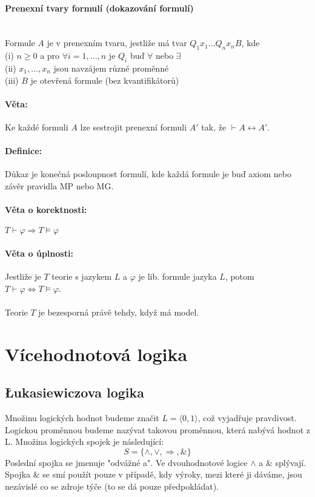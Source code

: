 \paragraph*{Prenexní tvary formulí (dokazování formulí)} ~\\
Formule $A$ je v prenexním tvaru, jestliže má tvar $Q_1 x_1 ... Q_n x_n B$, kde\\
(i) $n \geq 0 $ a pro $\forall i=1,...,n $ je $Q_i $ buď $\forall $ nebo $\exists $\\
(ii) $x_1,...,x_n$ jsou navzájem různé proměnné\\
(iii) $B$ je otevřená formule (bez kvantifikátorů)

\paragraph*{Věta:}Ke každé formuli $A$ lze sestrojit prenexní formuli $A'$ tak, že $\vdash A \leftrightarrow A'$.%

\paragraph*{Definice:} Důkaz je konečná posloupnost formulí, kde každá formule je buď axiom nebo závěr pravidla MP nebo MG.

\paragraph*{Věta o korektnosti:}
$T \vdash \varphi \Rightarrow T \models \varphi $

\paragraph*{Věta o úplnosti:}
Jestliže je $T$ teorie s jazykem $L$ a $\varphi $ je lib. formule jazyka $L$, potom $T \vdash \varphi \Leftrightarrow T \models \varphi $.\\
~\\
Teorie $T$ je bezesporná právě tehdy, když má model.



\section{Vícehodnotová logika}

\subsection{Łukasiewiczova logika}
Množinu logických hodnot budeme značit $L=\langle 0,1 \rangle$, což vyjadřuje pravdivost. Logickou proměnnou budeme nazývat takovou proměnnou, která nabývá hodnot z L. Množina logických spojek je následující:
$$S=\{\wedge, \vee,  \Rightarrow, \& \}$$
 Poslední spojka se jmenuje "odvážné a". Ve dvouhodnotové logice $\wedge$ a $\&$ splývají. Spojka \& se smí použít pouze v případě, kdy výroky, mezi které ji dáváme, jsou nezávislé co se zdroje týče (to se dá pouze předpokládat). 


